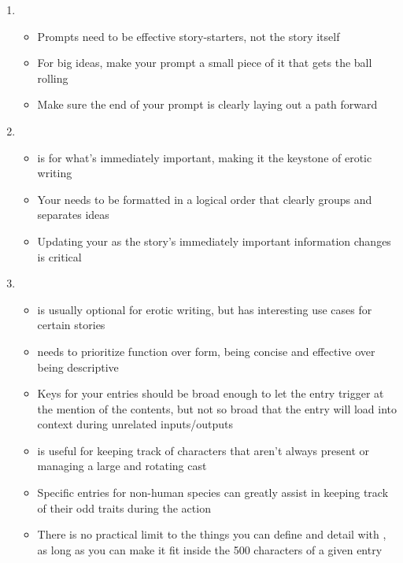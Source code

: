 ﻿\documentclass[Coomer-main.tex]{subfiles}
\begin{document}
\begin{enumerate}

\item {}

\begin{itemize}
\item Prompts need to be effective story-starters, not the story itself
\item For big ideas, make your prompt a small piece of it that gets the ball rolling
\item Make sure the end of your prompt is clearly laying out a path forward
\end{itemize}

\item {}

\begin{itemize}
\item \rem is for what's immediately important, making it the keystone of erotic writing
\item Your \rem needs to be formatted in a logical order that clearly groups and separates ideas
\item Updating your \rem as the story's immediately important information changes is critical
\end{itemize}

\item {}

\begin{itemize}
\item \wi is usually optional for erotic writing, but has interesting use cases for certain stories
\item \wi needs to prioritize function over form, being concise and effective over being descriptive
\item Keys for your entries should be broad enough to let the entry trigger at the mention of the contents, but not so broad that the entry will load into context during unrelated inputs/outputs
\item \wi is useful for keeping track of characters that aren't always present or managing a large and rotating cast
\item Specific \wi entries for non-human species can greatly assist in keeping track of their odd traits during the action
\item There is no practical limit to the things you can define and detail with \wi, as long as you can make it fit inside the 500 characters of a given entry
\end{itemize}


\end{enumerate}
\end{document}
